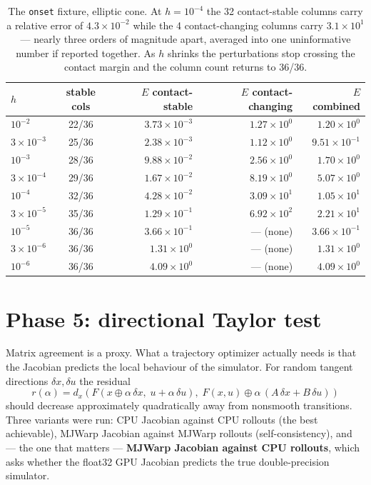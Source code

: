 \documentclass[11pt,a4paper]{article}
\newcommand{\code}[1]{\texttt{\small #1}}
\begin{document}
\begin{table}[htbp]
\centering
\footnotesize
\caption{The \code{onset} fixture, elliptic cone. At $h=10^{-4}$ the 32 contact-stable columns carry a relative error of $4.3\times10^{-2}$ while the 4 contact-changing columns carry $3.1\times10^{1}$ --- nearly three orders of magnitude apart, averaged into one uninformative number if reported together. As $h$ shrinks the perturbations stop crossing the contact margin and the column count returns to 36/36.}
\label{tab:split}
\begin{tabular}{lcrrr}
\toprule
$h$ & \textbf{stable cols} & $E$ \textbf{contact-stable} & $E$ \textbf{contact-changing} & $E$ \textbf{combined} \\
\midrule
$10^{-2}$ & 22/36 & $3.73\times10^{-3}$ & $1.27\times10^{0}$ & $1.20\times10^{0}$ \\
$3\times10^{-3}$ & 25/36 & $2.38\times10^{-3}$ & $1.12\times10^{0}$ & $9.51\times10^{-1}$ \\
$10^{-3}$ & 28/36 & $9.88\times10^{-2}$ & $2.56\times10^{0}$ & $1.70\times10^{0}$ \\
$3\times10^{-4}$ & 29/36 & $1.67\times10^{-2}$ & $8.19\times10^{0}$ & $5.07\times10^{0}$ \\
$10^{-4}$ & 32/36 & $4.28\times10^{-2}$ & $3.09\times10^{1}$ & $1.05\times10^{1}$ \\
$3\times10^{-5}$ & 35/36 & $1.29\times10^{-1}$ & $6.92\times10^{2}$ & $2.21\times10^{1}$ \\
$10^{-5}$ & 36/36 & $3.66\times10^{-1}$ & --- (none) & $3.66\times10^{-1}$ \\
$3\times10^{-6}$ & 36/36 & $1.31\times10^{0}$ & --- (none) & $1.31\times10^{0}$ \\
$10^{-6}$ & 36/36 & $4.09\times10^{0}$ & --- (none) & $4.09\times10^{0}$ \\
\bottomrule
\end{tabular}
\end{table}

\section{Phase 5: directional Taylor test}

Matrix agreement is a proxy. What a trajectory optimizer actually needs is that the
Jacobian predicts the local behaviour of the simulator. For random tangent directions
$\delta x, \delta u$ the residual
\[
r(\alpha) = d_x\!\left(F(x \oplus \alpha\,\delta x,\; u + \alpha\,\delta u),\;
F(x,u) \oplus \alpha\,(A\,\delta x + B\,\delta u)\right)
\]
should decrease approximately quadratically away from nonsmooth transitions. Three variants
were run: CPU Jacobian against CPU rollouts (the best achievable), MJWarp Jacobian against
MJWarp rollouts (self-consistency), and --- the one that matters --- \textbf{MJWarp Jacobian
against CPU rollouts}, which asks whether the float32 GPU Jacobian predicts the true
double-precision simulator.
\end{document}
